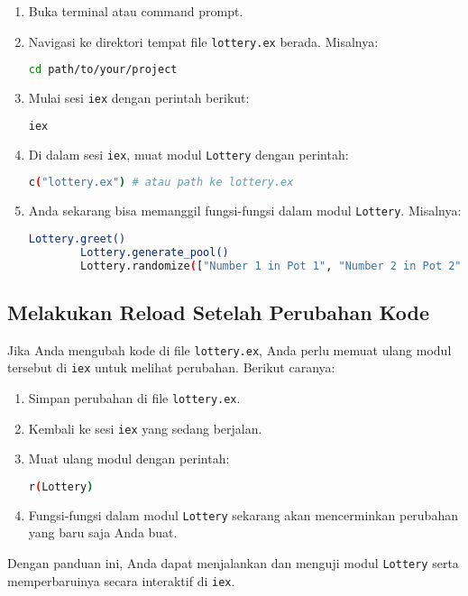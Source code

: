 \begin{enumerate}
	\item Buka terminal atau command prompt.
	\item Navigasi ke direktori tempat file \texttt{lottery.ex} berada. Misalnya:
	\begin{lstlisting}[language=bash]
		cd path/to/your/project
	\end{lstlisting}
	\item Mulai sesi \texttt{iex} dengan perintah berikut:
	\begin{lstlisting}[language=bash]
		iex
	\end{lstlisting}
	\item Di dalam sesi \texttt{iex}, muat modul \texttt{Lottery} dengan perintah:
	\begin{lstlisting}[language=bash]
		c("lottery.ex") # atau path ke lottery.ex
	\end{lstlisting}
	\item Anda sekarang bisa memanggil fungsi-fungsi dalam modul \texttt{Lottery}. Misalnya:
	\begin{lstlisting}[language=bash]
		Lottery.greet()
		Lottery.generate_pool()
		Lottery.randomize(["Number 1 in Pot 1", "Number 2 in Pot 2"])
	\end{lstlisting}
\end{enumerate}

\subsection{Melakukan Reload Setelah Perubahan Kode}

Jika Anda mengubah kode di file \texttt{lottery.ex}, Anda perlu memuat ulang modul tersebut di \texttt{iex} untuk melihat perubahan. Berikut caranya:

\begin{enumerate}
	\item Simpan perubahan di file \texttt{lottery.ex}.
	\item Kembali ke sesi \texttt{iex} yang sedang berjalan.
	\item Muat ulang modul dengan perintah:
	\begin{lstlisting}[language=bash]
		r(Lottery)
	\end{lstlisting}
	\item Fungsi-fungsi dalam modul \texttt{Lottery} sekarang akan mencerminkan perubahan yang baru saja Anda buat.
\end{enumerate}

Dengan panduan ini, Anda dapat menjalankan dan menguji modul \texttt{Lottery} serta memperbaruinya secara interaktif di \texttt{iex}.



